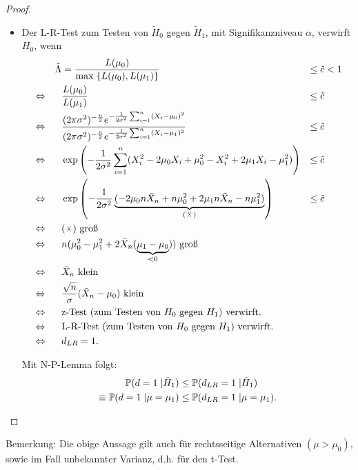 \documentclass{tstextbook}
\begin{document}
\begin{proof}
\begin{itemize}
		\item Der L-R-Test zum Testen von $ \tilde{H}_0 $ gegen $ \tilde{H}_1 $, mit Signifikanzniveau $\alpha$, verwirft $ H_0 $, wenn 
		\[
		\begin{aligned}
			& & \tilde{\Lambda} & = \frac{L(\mu_0)}{\max\;\{L(\mu_0),L(\mu_1)\}} & \le \tilde{c} & < 1 \\
			&  \Leftrightarrow & & \frac{L(\mu_0)}{L(\mu_1)} & \le \tilde{c} \\
			& \Leftrightarrow & & \frac{(2\pi\sigma^2)^{-\frac{n}{2}}e^{-\frac{1}{2\sigma^2}\sum_{i=1}^{n}(X_i-\mu_0)^2}}{(2\pi\sigma^2)^{-\frac{n}{2}}e^{-\frac{1}{2\sigma^2}\sum_{i=1}^{n}(X_i-\mu_1)^2}} & \le \tilde{c} \\
			& \Leftrightarrow & & \exp\left(-\frac{1}{2\sigma^2}\sum_{i=1}^{n}(X_i^2-2\mu_0X_i+\mu_0^2-X_i^2+2\mu_1X_i-\mu_1^2)\right) & \le \tilde{c} \\
			& \Leftrightarrow & & \exp\left(-\frac{1}{2\sigma^2}\underbrace{(-2\mu_0n\bar{X}_n+n\mu_0^2+2\mu_1n\bar{X}_n-n\mu_1^2)}_{(\hexstar)}\right) & \le \tilde{c} \\
			& \Leftrightarrow & & (\hexstar) \text{ groß} \\
			& \Leftrightarrow & & n(\mu_0^2-\mu_1^2+2\bar{X}_n(\underbrace{\mu_1-\mu_0}_{<0})) \text{ groß} \\
			& \Leftrightarrow && \bar{X}_n \text{ klein} \\
			& \Leftrightarrow && \frac{\sqrt{n}}{\sigma}(\bar{X}_n-\mu_0) \text{ klein} \\
			& \Leftrightarrow && \text{z-Test (zum Testen von }H_0 \text{ gegen } H_1 \text{) verwirft.} \\
			& \Leftrightarrow && \text{L-R-Test (zum Testen von }H_0 \text{ gegen } H_1 \text{) verwirft.}\\
			& \Leftrightarrow & & d_{LR} = 1.
		\end{aligned}
		\]
		
		Mit N-P-Lemma folgt:
		\[
		\begin{aligned}
			\mathbb P(d=1\;|\tilde{H}_1) & \le \mathbb P(d_{LR}=1\;|\tilde{H}_1) \\
			\equiv \mathbb P(d=1\;|\mu=\mu_1) & \le \mathbb P(d_{LR}=1\;|\mu=\mu_1).
		\end{aligned}
		\]
	\end{itemize}

\end{proof}

\begin{remark}
	Bemerkung: Die obige Aussage gilt auch für rechtsseitige Alternativen $ (\mu>\mu_0) $, sowie im Fall unbekannter Varianz, d.h. für den t-Test.
\end{remark}
\end{document}
